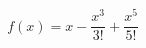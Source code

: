 \documentclass[preview]{standalone}
\begin{document}
\begin{align*}
f(x)=x-\dfrac{x^3}{3!}+\dfrac{x^5}{5!}
\end{align*}
\end{document}
